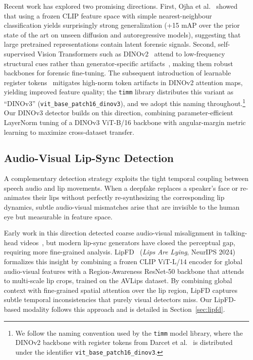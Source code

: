 \documentclass[conference]{IEEEtran}
\begin{document}
Recent work has explored two promising directions. First, Ojha et al.~\cite{ojha2023universal} showed that using a frozen CLIP feature space with simple nearest-neighbour classification yields surprisingly strong generalization (+15 mAP over the prior state of the art on unseen diffusion and autoregressive models), suggesting that large pretrained representations contain latent forensic signals. Second, self-supervised Vision Transformers such as DINOv2~\cite{oquab2024dinov2} attend to low-frequency structural cues rather than generator-specific artifacts~\cite{rethinking_forgery}, making them robust backbones for forensic fine-tuning. The subsequent introduction of learnable register tokens~\cite{darcet2024registers} mitigates high-norm token artifacts in DINOv2 attention maps, yielding improved feature quality; the \texttt{timm} library distributes this variant as ``DINOv3'' (\texttt{vit\_base\_patch16\_dinov3}), and we adopt this naming throughout.\footnote{We follow the naming convention used by the \texttt{timm} model library, where the DINOv2 backbone with register tokens from Darcet et al.~\cite{darcet2024registers} is distributed under the identifier \texttt{vit\_base\_patch16\_dinov3}.} Our DINOv3 detector builds on this direction, combining parameter-efficient LayerNorm tuning of a DINOv3 ViT-B/16 backbone with angular-margin metric learning to maximize cross-dataset transfer.

\subsection{Audio-Visual Lip-Sync Detection}
A complementary detection strategy exploits the tight temporal coupling between speech audio and lip movements. When a deepfake replaces a speaker's face or re-animates their lips without perfectly re-synthesizing the corresponding lip dynamics, subtle audio-visual mismatches arise that are invisible to the human eye but measurable in feature space.

Early work in this direction detected coarse audio-visual misalignment in talking-head videos~\cite{temporal_detection}, but modern lip-sync generators have closed the perceptual gap, requiring more fine-grained analysis. LipFD~\cite{lipfd2024} (\emph{Lips Are Lying}, NeurIPS 2024) formalizes this insight by combining a frozen CLIP ViT-L/14 encoder for global audio-visual features with a Region-Awareness ResNet-50 backbone that attends to multi-scale lip crops, trained on the AVLips dataset. By combining global context with fine-grained spatial attention over the lip region, LipFD captures subtle temporal inconsistencies that purely visual detectors miss. Our LipFD-based modality follows this approach and is detailed in Section~\ref{sec:lipfd}.
\end{document}
